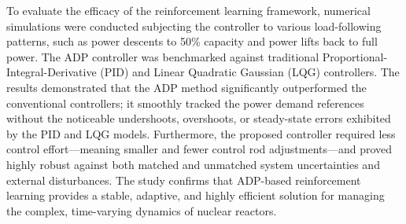 \documentclass{article}
\begin{document}
To evaluate the efficacy of the reinforcement learning framework, numerical simulations were conducted subjecting the controller to various load-following patterns, such as power descents to 50\% capacity and power lifts back to full power. The ADP controller was benchmarked against traditional Proportional-Integral-Derivative (PID) and Linear Quadratic Gaussian (LQG) controllers. The results demonstrated that the ADP method significantly outperformed the conventional controllers; it smoothly tracked the power demand references without the noticeable undershoots, overshoots, or steady-state errors exhibited by the PID and LQG models. Furthermore, the proposed controller required less control effort—meaning smaller and fewer control rod adjustments—and proved highly robust against both matched and unmatched system uncertainties and external disturbances. The study confirms that ADP-based reinforcement learning provides a stable, adaptive, and highly efficient solution for managing the complex, time-varying dynamics of nuclear reactors.
\end{document}
